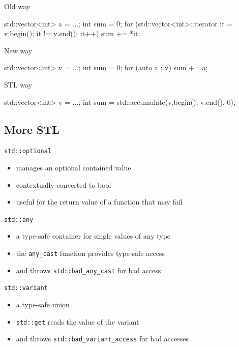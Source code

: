 \begin{frame}[fragile]
  \begin{block}{Old way}
    \begin{cppcode*}{}
      std::vector<int> a = ...;
      int sum = 0;
      for (std::vector<int>::iterator it = v.begin();
           it != v.end(); it++) {
        sum += *it;
      }
    \end{cppcode*}
  \end{block}
  \pause
  \begin{block}{New way}
    \begin{cppcode*}{}
      std::vector<int> v = ...;
      int sum = 0;
      for (auto a : v) { sum += a; }
    \end{cppcode*}
  \end{block}
  \pause
  \begin{exampleblock}{STL way}
    \begin{cppcode*}{}
      std::vector<int> v = ...;
      int sum = std::accumulate(v.begin(), v.end(), 0);
    \end{cppcode*}
  \end{exampleblock}
\end{frame}

\subsection{More STL}

\begin{frame}[fragile]
  \begin{block}{\texttt{std::optional}}
    \begin{itemize}
    \item manages an optional contained value
    \item contextually converted to bool
    \item useful for the return value of a function that may fail
    \end{itemize}
  \end{block}
  \begin{block}{\texttt{std::any}}
    \begin{itemize}
    \item a type-safe container for single values of any type
    \item the \texttt{any\_cast} function provides type-safe access
    \item and throws \texttt{std::bad\_any\_cast} for bad access
    \end{itemize}
  \end{block}
  \begin{block}{\texttt{std::variant}}
    \begin{itemize}
    \item a type-safe union
    \item \texttt{std::get} reads the value of the variant
    \item and throws \texttt{std::bad\_variant\_access} for bad accesses
    \end{itemize}
  \end{block}
\end{frame}

